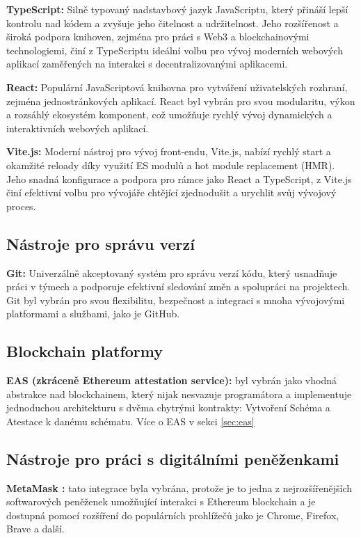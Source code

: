 \textbf{TypeScript:} Silně typovaný nadstavbový jazyk JavaScriptu, který přináší lepší kontrolu nad kódem a zvyšuje jeho čitelnost a udržitelnost. Jeho rozšířenost a široká podpora knihoven, zejména pro práci s Web3 a blockchainovými technologiemi, činí z TypeScriptu ideální volbu pro vývoj moderních webových aplikací zaměřených na interakci s decentralizovanými aplikacemi.

\textbf{React:} Populární JavaScriptová knihovna pro vytváření uživatelských rozhraní, zejména jednostránkových aplikací. React byl vybrán pro svou modularitu, výkon a rozsáhlý ekosystém komponent, což umožňuje rychlý vývoj dynamických a interaktivních webových aplikací.



\textbf{Vite.js:} Moderní nástroj pro vývoj front-endu, Vite.js, nabízí rychlý start a okamžité reloady díky využití ES modulů a hot module replacement (HMR). Jeho snadná konfigurace a podpora pro rámce jako React a TypeScript, z Vite.js činí efektivní volbu pro vývojáře chtějící zjednodušit a urychlit svůj vývojový proces.


\subsection{Nástroje pro správu verzí}

\textbf{Git:} Univerzálně akceptovaný systém pro správu verzí kódu, který usnadňuje práci v týmech a podporuje efektivní sledování změn a spolupráci na projektech. Git byl vybrán pro svou flexibilitu, bezpečnost a integraci s mnoha vývojovými platformami a službami, jako je GitHub.


\subsection{Blockchain platformy}

\textbf{EAS (zkráceně Ethereum attestation service):} byl vybrán jako vhodná abstrakce nad blockchainem, který nijak nesvazuje programátora a implementuje jednoduchou architekturu s dvěma chytrými kontrakty: Vytvoření Schéma a Atestace k danému schématu. Více o EAS v sekci \ref{sec:eas}

\subsection{Nástroje pro práci s digitálními peněženkami}

\textbf{MetaMask :} tato integrace byla vybrána, protože je to jedna z nejrozšířenějších softwarových peněženek umožňující interakci s Ethereum blockchain a je dostupná pomocí rozšíření do populárních prohlížečů jako je Chrome, Firefox, Brave a další.



